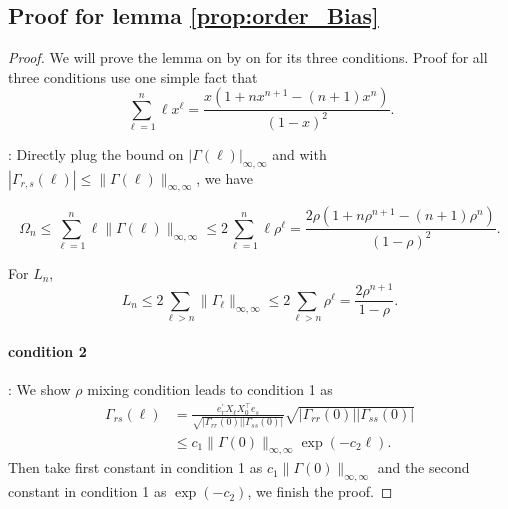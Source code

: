\subsection*{Proof for lemma \ref{prop:order_Bias}}
\begin{proof}
We will prove the lemma on by on for its three conditions. Proof for all three conditions use one simple fact that 
\begin{equation}
\sum_{\ell=1}^n \ell x^\ell = \frac{x(1+nx^{n+1}-(n+1)x^n)}{(1-x)^2}.
\end{equation}

: Directly plug the bound on $|\Gamma(\ell)|_{\infty, \infty}$ and with $|\Gamma_{r,s}(\ell)|\le \|\Gamma(\ell)\|_{\infty, \infty}$, we have 

\begin{equation}
\Omega_n \le \sum_{\ell=1}^n \ell \|\Gamma(\ell)\|_{\infty, \infty}\le  2\sum_{\ell=1}^n \ell \rho^{\ell} = \frac{2\rho(1+n\rho^{n+1}-(n+1)\rho^n)}{(1-\rho)^2}.
\end{equation}

For $L_n$, 
\begin{equation}
L_n \le 2\sum_{\ell> n} \|\Gamma_{\ell}\|_{\infty, \infty} \le 2\sum_{\ell>n} \rho^\ell = \frac{2\rho^{n+1}}{1-\rho}. 
\end{equation}

\paragraph{condition 2}: We show $\rho$ mixing condition leads to condition 1 as 
\begin{equation}
\begin{aligned}
\Gamma_{rs}(\ell) &= \frac{e_r^\prime X_{\ell}X_{0}^\top e_s}{\sqrt{|\Gamma_{rr}(0)||\Gamma_{ss}(0)|}}\sqrt{|\Gamma_{rr}(0)||\Gamma_{ss}(0)|}\\
& \le c_1 \|\Gamma(0)\|_{\infty, \infty} \exp(-c_2\ell).
\end{aligned}
\end{equation}
Then take first constant in condition 1 as $c_1 \|\Gamma(0)\|_{\infty, \infty}$ and the second constant in condition 1 as $\exp(-c_2)$, we finish the proof. 



\end{proof}
